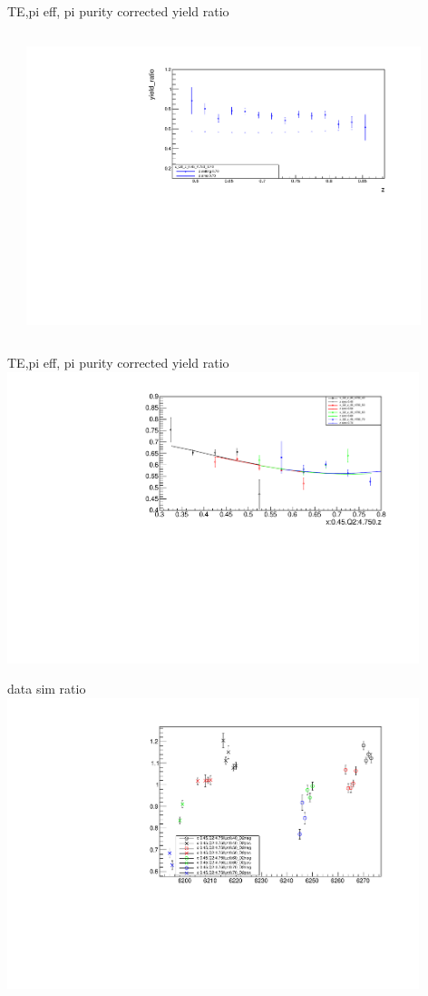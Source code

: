 \begin{frame}{TE,pi eff, pi purity corrected yield ratio}
\begin{columns}
\begin{column}[T]{0.5\textwidth}
\end{column}
\begin{column}[T]{0.5\textwidth}
\includegraphics[width = 0.9\textwidth]{results/yield/statistics_corr/x_Q2_z_45_4750_70_ratio.pdf}
\end{column}
\end{columns}
\end{frame}
\begin{frame}{TE,pi eff, pi purity corrected yield ratio}
\includegraphics[width = 0.9\textwidth]{results/yield/statistics_corr/x_Q2_45_4750_ratio.pdf}
\end{frame}
\begin{frame}{data sim ratio}
    \includegraphics[width = 0.9\textwidth]{results/yield/run_info_pdf/x_Q2_45_4750_data_simc_ratio.pdf}
\end{frame}
